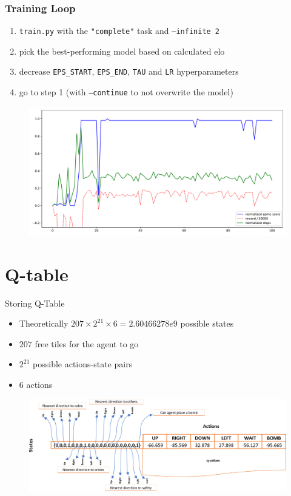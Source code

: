 \documentclass{beamer}
\begin{document}
\begin{frame}[fragile]
	\frametitle{Training Loop}
	\pause

	\begin{enumerate}
			\item \texttt{train.py} with the \texttt{"complete"} task and \texttt{--infinite 2}
			\item pick the best-performing model based on calculated elo
			\item decrease \texttt{EPS\_START}, \texttt{EPS\_END}, \texttt{TAU} and \texttt{LR} hyperparameters
			\item go to step 1 (with \texttt{--continue} to not overwrite the model)
	\end{enumerate}

	\pause
	\begin{figure}[t]
			\centering
			\includegraphics[width=.8\linewidth]{coins.pdf}
	\end{figure}
\end{frame}

\section{Q-table}

\begin{frame}{Storing Q-Table}
	\pause
	\begin{itemize}
		\item Theoretically $207 \times 2^{21} \times 6 = 2.60466278e9$ possible states
		\item $207$ free tiles for the agent to go
		\item $2^{21}$ possible actions-state pairs
		\item $6$ actions
	\end{itemize}

	\begin{figure}[t]
			\centering
			\includegraphics[width=1\linewidth]{Q-table.png}
	\end{figure}
\end{frame}
\end{document}

